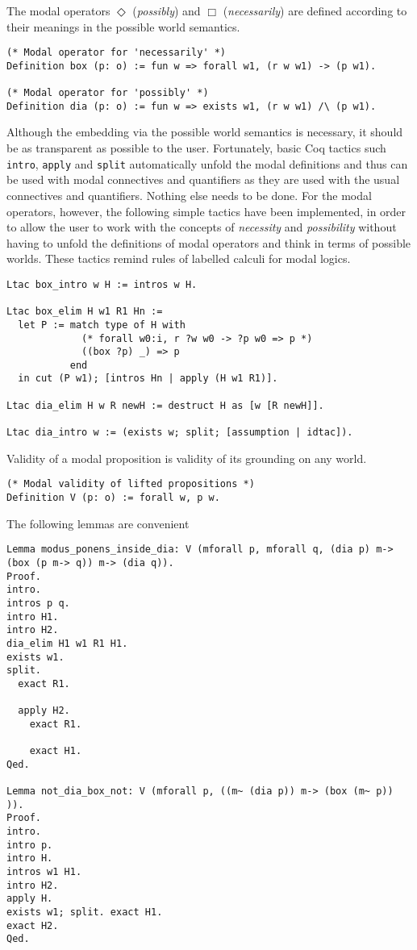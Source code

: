 \documentclass{llncs}
\begin{document}
\noindent
The modal operators $\Diamond$ (\emph{possibly}) and $\Box$ (\emph{necessarily}) are defined according to their meanings in the possible world semantics.

\begin{Verbatim}[commandchars=\\\{\}]
(* Modal operator for 'necessarily' *)
Definition box (p: o) := fun w => forall w1, (r w w1) -> (p w1).

(* Modal operator for 'possibly' *)
Definition dia (p: o) := fun w => exists w1, (r w w1) /\ (p w1).
\end{Verbatim}


\noindent
Although the embedding via the possible world semantics is necessary, it should be as transparent as possible to the user. Fortunately, basic Coq tactics such \texttt{intro}, \texttt{apply} and \texttt{split} automatically unfold the modal definitions and thus can be used with modal connectives and quantifiers as they are used with the usual connectives and quantifiers. Nothing else needs to be done. For the modal operators, however, the following simple tactics have been implemented, in order to allow the user to work with the concepts of \emph{necessity} and \emph{possibility} without having to unfold the definitions of modal operators and think in terms of possible worlds. These tactics remind rules of labelled calculi for modal logics.


\begin{verbatim}
Ltac box_intro w H := intros w H.

Ltac box_elim H w1 R1 Hn := 
  let P := match type of H with
             (* forall w0:i, r ?w w0 -> ?p w0 => p *)
             ((box ?p) _) => p
           end
  in cut (P w1); [intros Hn | apply (H w1 R1)].

Ltac dia_elim H w R newH := destruct H as [w [R newH]].

Ltac dia_intro w := (exists w; split; [assumption | idtac]).
\end{verbatim}


\noindent
Validity of a modal proposition is validity of its grounding on any world.

\begin{verbatim}
(* Modal validity of lifted propositions *)
Definition V (p: o) := forall w, p w.
\end{verbatim}

\noindent
The following lemmas are convenient 

\begin{verbatim}
Lemma modus_ponens_inside_dia: V (mforall p, mforall q, (dia p) m-> (box (p m-> q)) m-> (dia q)).
Proof.
intro.
intros p q.
intro H1.
intro H2.
dia_elim H1 w1 R1 H1.
exists w1.
split.
  exact R1.

  apply H2. 
    exact R1.

    exact H1.
Qed.

Lemma not_dia_box_not: V (mforall p, ((m~ (dia p)) m-> (box (m~ p)) )).
Proof.
intro.
intro p.
intro H.
intros w1 H1.
intro H2.
apply H.
exists w1; split. exact H1.
exact H2.
Qed.
\end{verbatim}
\end{document}
